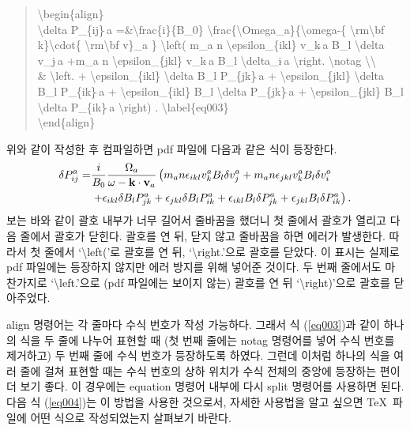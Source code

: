 \documentclass[twoside,11pt]{gshs_thesis}
\begin{document}
\begin{quote}
{\textbackslash}begin\{align\}\\
{\textbackslash}delta P\_\{ij\}$\hat{\ }$a =\&{\textbackslash}frac\{i\}\{B\_0\} {\textbackslash}frac\{{\textbackslash}Omega\_a\}\{{\textbackslash}omega-\{ {\textbackslash}rm{\textbackslash}bf k\}{\textbackslash}cdot\{ {\textbackslash}rm{\textbackslash}bf v\}\_a \} {\textbackslash}left( m\_a n {\textbackslash}epsilon\_\{ikl\} v\_k$\hat{\ }$a B\_l {\textbackslash}delta v\_j$\hat{\ }$a +m\_a n {\textbackslash}epsilon\_\{jkl\} v\_k$\hat{\ }$a B\_l {\textbackslash}delta\_i$\hat{\ }$a {\textbackslash}right. {\textbackslash}notag {\textbackslash}{\textbackslash} \\
\& {\textbackslash}left. + {\textbackslash}epsilon\_\{ikl\} {\textbackslash}delta B\_l P\_\{jk\}$\hat{\ }$a + {\textbackslash}epsilon\_\{jkl\} {\textbackslash}delta B\_l P\_\{ik\}$\hat{\ }$a + {\textbackslash}epsilon\_\{ikl\} B\_l {\textbackslash}delta P\_\{jk\}$\hat{\ }$a + {\textbackslash}epsilon\_\{jkl\} B\_l {\textbackslash}delta P\_\{ik\}$\hat{\ }$a {\textbackslash}right) . {\textbackslash}label\{eq003\} \\
{\textbackslash}end\{align\}
\end{quote}
위와 같이 작성한 후 컴파일하면 pdf 파일에 다음과 같은 식이 등장한다.
\begin{align}
\delta P_{ij}^a =&\frac{i}{B_0} \frac{\Omega_a}{\omega-{\rm\bf k}\cdot{\rm\bf v}_a} \left( m_a n \epsilon_{ikl} v_k^a B_l \delta v_j^a +m_a n \epsilon_{jkl} v_k^a B_l \delta v_i^a \right. \notag\\
&\left. +\epsilon_{ikl} \delta B_l P_{jk}^a +\epsilon_{jkl} \delta B_l P_{ik}^a +\epsilon_{ikl} B_l \delta P_{jk}^a +\epsilon_{jkl} B_l \delta P_{ik}^a \right) . \label{eq003}
\end{align}
보는 바와 같이 괄호 내부가 너무 길어서 줄바꿈을 했더니 첫 줄에서 괄호가 열리고 다음 줄에서 괄호가 닫힌다.  괄호를 연 뒤, 닫지 않고 줄바꿈을 하면 에러가 발생한다. 따라서 첫 줄에서 `{\textbackslash}left('로 괄호를 연 뒤, `{\textbackslash}right.'으로 괄호를 닫았다. 이 표시는 실제로 pdf 파일에는 등장하지 않지만 에러 방지를 위해 넣어준 것이다. 두 번째 줄에서도 마찬가지로 `{\textbackslash}left.'으로 (pdf 파일에는 보이지 않는) 괄호를 연 뒤 `{\textbackslash}right)'으로 괄호를 닫아주었다.

align 명령어는 각 줄마다 수식 번호가 작성 가능하다. 그래서 식 (\ref{eq003})과 같이 하나의 식을 두 줄에 나누어 표현할 때 (첫 번째 줄에는 notag 명령어를 넣어 수식 번호를 제거하고) 두 번째 줄에 수식 번호가 등장하도록 하였다. 그런데 이처럼 하나의 식을 여러 줄에 걸쳐 표현할 때는 수식 번호의 상하 위치가 수식 전체의 중앙에 등장하는 편이 더 보기 좋다. 이 경우에는 equation 명령어 내부에 다시 split 명령어를 사용하면 된다. 다음 식 (\ref{eq004})는 이 방법을 사용한 것으로서, 자세한 사용법을 알고 싶으면 \TeX\ 파일에 어떤 식으로 작성되었는지 살펴보기 바란다.
\end{document}
